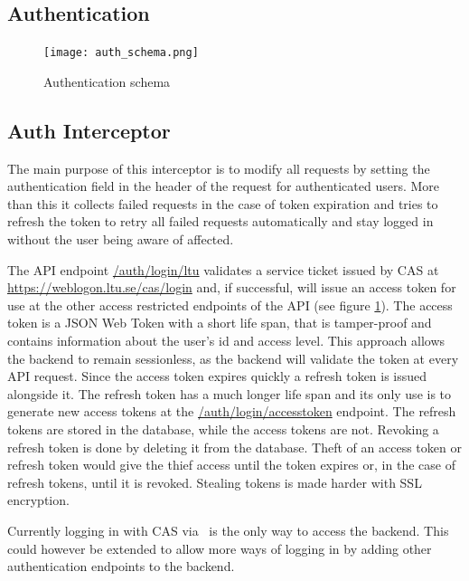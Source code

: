 \subsection{Authentication}
\begin{figure}[hb]
    \centering
    \texttt{[image: auth\_schema.png]}
    \caption{Authentication schema}
    \label{fig:auth}
\end{figure}

\subsection{Auth Interceptor}
The main purpose of this interceptor is to modify all requests by setting the authentication field in the header of the request for authenticated users. More than this it collects failed requests in the case of token expiration and tries to refresh the token to retry all failed requests automatically and stay logged in without the user being aware of affected.

The API endpoint \url{/auth/login/ltu} validates a service ticket issued by CAS at \url{https://weblogon.ltu.se/cas/login} and, if successful, will issue an access token for use at the other access restricted endpoints of the API (see figure \ref{fig:auth}). The access token is a JSON Web Token with a short life span, that is tamper-proof and contains information about the user's id and access level. This approach allows the backend to remain sessionless, as the backend will validate the token at every API request. Since the access token expires quickly a refresh token is issued alongside it. The refresh token has a much longer life span and its only use is to generate new access tokens at the \url{/auth/login/accesstoken} endpoint. The refresh tokens are stored in the database, while the access tokens are not. Revoking a refresh token is done by deleting it from the database. Theft of an access token or refresh token would give the thief access until the token expires or, in the case of refresh tokens, until it is revoked. Stealing tokens is made harder with SSL encryption.

Currently logging in with CAS via \LTU\ is the only way to access the backend. This could however be extended to allow more ways of logging in by adding other authentication endpoints to the backend.

